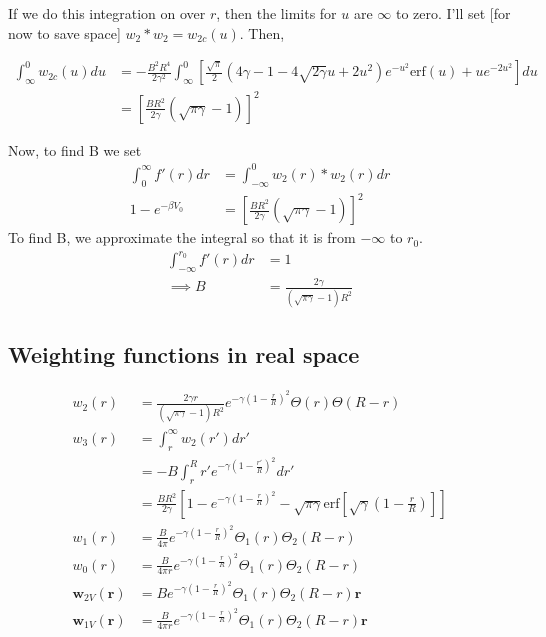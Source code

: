 \documentclass[letterpaper,twocolumn,amsmath,amssymb,prb]{revtex4-1}
\newcommand{\red}[1]{{\color{red} #1}}
\newcommand{\rr}{\textbf{r}}
\newcommand{\fixme}[1]{\red{[#1]}}
\begin{document}
If we do this integration on over $r$, then the limits for $u$ are
$\infty$ to zero.  I'll set \fixme{for now to save space} $w_2\ast
w_2 = w_{2c}(u)$. Then,
\begin{widetext}
\begin{align}
\int_{\infty}^0 w_{2c}(u) du &= -\frac{B^2 R^4}{2 \gamma^2}
           \int_\infty^0 \left[ \frac{\sqrt{\pi}}{2} \left( 4\gamma - 1 -
           4\sqrt{2\gamma}u + 2 u^2 \right) e^{-u^2} \textrm{erf}(u) +
           u e^{-2u^2} \right]du \\
           &= \left[ \frac{B R^2}{2\gamma} (\sqrt{\pi \gamma} -1) \right]^2
\end{align}
\end{widetext}
Now, to find B we set
\begin{align}
  \int_0^{\infty} f'(r)dr &= \int_{-\infty}^0 w_2(r)\ast w_2(r) dr\\
   1 - e^{-\beta V_0} &= \left[ \frac{B R^2}{2\gamma} (\sqrt{\pi
      \gamma} -1)  \right]^2
 \end{align}
To find B, we approximate the integral so that it is from $-\infty$ to $r_0$.
\begin{align}
  \int_{-\infty}^{r_0} f'(r)dr &= 1 \\
  \implies B &= \frac{2\gamma}{(\sqrt{\pi \gamma}-1)R^2}
\end{align}

\subsection{Weighting functions in real space}

\begin{align}
  w_2(r) &=\frac{2\gamma r}
  {(\sqrt{\pi \gamma}-1)R^2}e^{-\gamma \left ( 1 - \frac{r}{R} \right)^2}
           \Theta(r) \Theta(R - r )\\
  w_3(r) &= \int_r^\infty w_2(r') dr'\\
         &= -B \int_r^R r' e^{-\gamma \left(1- \frac{r'}{R} \right)^2}dr'\\
         &= \frac{B R^2}{2\gamma}\left[ 1 - e^{-\gamma
      \left(1-\frac{r}{R} \right)^2} - \sqrt{\pi \gamma} \mathrm{erf} \left[
        \sqrt{\gamma} \left( 1- \frac{r}{R} \right) \right] \right]\\
  w_1(r) &= \frac{B}{4\pi}e^{-\gamma \left ( 1 - \frac{r}{R}
            \right)^2} \Theta_1(r) \Theta_2 (R - r)\\
  w_0(r) &= \frac{B}{4\pi r}e^{-\gamma \left ( 1 - \frac{r}{R}
            \right)^2} \Theta_1(r) \Theta_2 (R - r)\\
  \mathbf{w}_{2V}(\rr) &= B e^{-\gamma \left ( 1 - \frac{r}{R} \right)^2}
           \Theta_1(r) \Theta_2 (R - r) \rr\\
  \mathbf{w}_{1V}(\rr) &= \frac{B}{4\pi r} e^{-\gamma \left ( 1 - \frac{r}{R} \right)^2}
           \Theta_1(r) \Theta_2 (R - r )\rr
\end{align}
\end{document}
